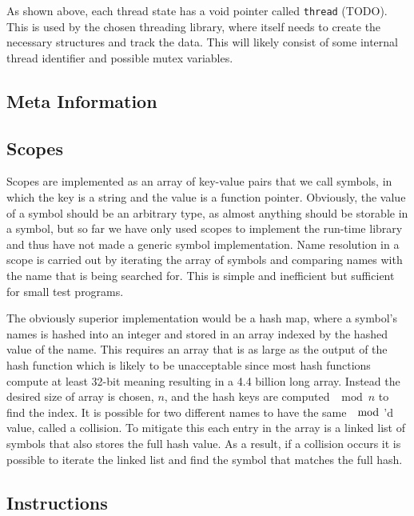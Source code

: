As shown above, each thread state has a void pointer called {\tt thread}
(TODO). This is used by the chosen threading library, where itself needs to
create the necessary structures and track the data. This will likely consist of
some internal thread identifier and possible mutex variables.

\subsection{Meta Information}
\label{sec:implementation:meta}


\subsection{Scopes}

Scopes are implemented as an array of key-value pairs that we call symbols, in
which the key is a string and the value is a function pointer. Obviously, the
value of a symbol should be an arbitrary type, as almost anything should be
storable in a symbol, but so far we have only used scopes to implement the
run-time library and thus have not made a generic symbol implementation. Name
resolution in a scope is carried out by iterating the array of symbols and
comparing names with the name that is being searched for. This is simple and
inefficient but sufficient for small test programs.

The obviously superior implementation would be a hash map, where a symbol's
names is hashed into an integer and stored in an array indexed by the hashed
value of the name. This requires an array that is as large as the output of the
hash function which is likely to be unacceptable since most hash functions
compute at least 32-bit meaning resulting in a 4.4 billion long array. Instead
the desired size of array is chosen, $n$, and the hash keys are computed
$\mod n$ to find the index. It is possible for two different names to have the
same $\mod$'d value, called a collision. To mitigate this each entry in the
array is a linked list of symbols that also stores the full hash value. As a
result, if a collision occurs it is possible to iterate the linked list and find
the symbol that matches the full hash.

\subsection{Instructions}
\label{sec:implementation:instr}


